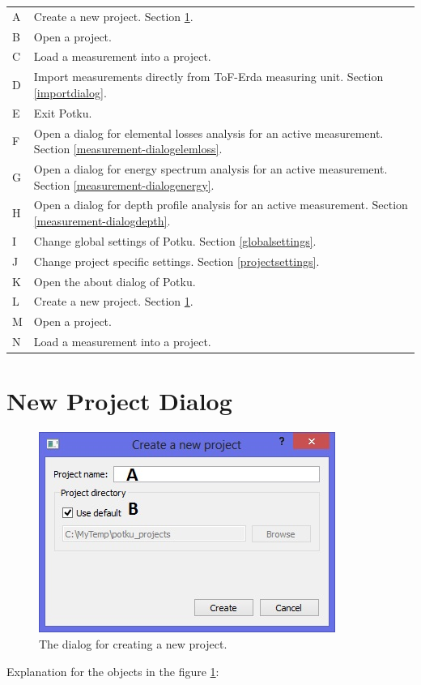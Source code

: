 \documentclass{scrreprt}
\begin{document}
\begin{tabular}{ll}
A & Create a new project. Section \ref{projectdialog}.\\
B & Open a project.\\
C & Load a measurement into a project.\\
D & Import measurements directly from ToF-Erda measuring unit. Section \ref{importdialog}.\\
E & Exit Potku.\\
F & Open a dialog for elemental losses analysis for an active measurement. Section \ref{measurement-dialogelemloss}.\\
G & Open a dialog for energy spectrum analysis for an active measurement. Section \ref{measurement-dialogenergy}.\\
H & Open a dialog for depth profile analysis for an active measurement. Section \ref{measurement-dialogdepth}.\\
I & Change global settings of Potku. Section \ref{globalsettings}.\\
J & Change project specific settings. Section \ref{projectsettings}.\\
K & Open the about dialog of Potku.\\
L & Create a new project. Section \ref{projectdialog}.\\
M & Open a project.\\
N & Load a measurement into a project.\\
\end{tabular}

\section{New Project Dialog}\label{projectdialog}
\begin{figure}[H]
\centering
\includegraphics[scale=1]{projectdialog}
\caption{The dialog for creating a new project.}
\label{fig-projectdialog}
\end{figure}
Explanation for the objects in the figure \ref{fig-projectdialog}:
\end{document}
